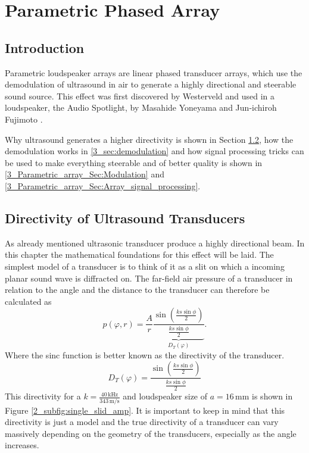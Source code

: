 \chapter{Parametric Phased Array}
\section{Introduction}
Parametric loudspeaker arrays are linear phased transducer arrays, which use the demodulation of ultrasound in air to generate a highly directional and steerable sound source. This effect was first discovered by Westerveld \cite{doi:10.1121/1.1918525} and used in a loudspeaker, the Audio Spotlight, by Masahide Yoneyama and Jun‐ichiroh Fujimoto \cite{doi:10.1121/1.389414}.

Why ultrasound generates a higher directivity is shown in Section \ref{3_sec:directivity}, how the demodulation works in \ref{3_sec:demodulation} and how signal processing tricks can be used to make everything steerable and of better quality is shown in \ref{3_Parametric_array_Sec:Modulation} and \ref{3_Parametric_array_Sec:Array_signal_processing}.
\section{Directivity of Ultrasound Transducers}\label{3_sec:directivity}
As already mentioned ultrasonic transducer produce a highly directional beam. In this chapter the mathematical foundations for this effect will be laid. 
The simplest model of a transducer is to think of it as a slit on which a incoming planar sound wave is diffracted on.\cite{alma99116706330905515} 
The far-field air pressure of a transducer in relation to the angle and the distance to the transducer can therefore be calculated as
\begin{equation}
    p(\varphi,r) 
    = 
    \frac{A}{r} \underbrace{\frac{\sin \left ( \frac{ks \sin \phi}{2}\right )}{ \frac{ks \sin \phi}{2}}}_{D_T(\varphi)}.
\end{equation}
Where the sinc function is better known as the directivity of the transducer. 
\begin{equation}
    D_T(\varphi) = \frac{\sin \left ( \frac{ks \sin \phi}{2}\right )}{ \frac{ks \sin \phi}{2}}
\end{equation}
This directivity for a $k = \frac{40 \, \text{kHz}}{343 \, \text{m/s}}$ and loudspeaker size of $a = 16 \, \text{mm}$ is shown in Figure \ref{2_subfig:single_slid_amp}. It is important to keep in mind that this directivity is just a model and the true directivity of a transducer can vary massively depending on the geometry of the transducers, especially as the angle increases.
